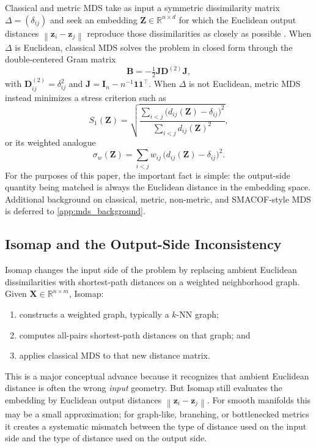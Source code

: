 \documentclass[11pt]{article}
\newcommand{\R}{\mathbb{R}}
\newcommand{\bX}{\mathbf{X}}
\newcommand{\bz}{\mathbf{z}}
\newcommand{\bZ}{\mathbf{Z}}
\newcommand{\bD}{\mathbf{D}}
\newcommand{\bB}{\mathbf{B}}
\newcommand{\bI}{\mathbf{I}}
\newcommand{\bJ}{\mathbf{J}}
\newcommand{\norm}[1]{\left\|#1\right\|}
\newcommand{\StressOne}{S_1}
\theoremstyle{definition}
\theoremstyle{plain}
\theoremstyle{remark}
\begin{document}
Classical and metric MDS take as input a symmetric dissimilarity matrix
$\Delta=(\delta_{ij})$ and seek an embedding $\bZ\in\R^{n\times d}$ for which
the Euclidean output distances $\norm{\bz_i-\bz_j}$ reproduce those
dissimilarities as closely as possible
\citep{torgerson1952multidimensional, young1938discussion,
kruskal1964multidimensional, borg2005modern}.  When $\Delta$ is Euclidean,
classical MDS solves the problem in closed form through the double-centered
Gram matrix
\begin{equation}
  \bB = -\tfrac{1}{2} \bJ \bD^{(2)} \bJ,
  \label{eq:gram}
\end{equation}
with $\bD^{(2)}_{ij}=\delta_{ij}^2$ and
$\bJ=\bI_n-n^{-1}\mathbf{1}\mathbf{1}^\top$.  When $\Delta$ is not Euclidean,
metric MDS instead minimizes a stress criterion such as
\begin{equation}
  \StressOne(\bZ) = \sqrt{
    \frac{\displaystyle\sum_{i < j}
          \bigl(d_{ij}(\bZ) - \delta_{ij}\bigr)^2}
         {\displaystyle\sum_{i < j} d_{ij}(\bZ)^2}
  },
  \label{eq:stress1}
\end{equation}
or its weighted analogue
\begin{equation}
  \sigma_w(\bZ)
  = \sum_{i < j} w_{ij}\,\bigl(d_{ij}(\bZ) - \delta_{ij}\bigr)^2.
  \label{eq:weighted_stress}
\end{equation}
For the purposes of this paper, the important fact is simple: the output-side
quantity being matched is always the Euclidean distance in the embedding space.
Additional background on classical, metric, non-metric, and SMACOF-style MDS
is deferred to \cref{app:mds_background}.

\subsection{Isomap and the Output-Side Inconsistency}
\label{sec:isomap}

Isomap \citep{tenenbaum2000global} changes the input side of the problem by
replacing ambient Euclidean dissimilarities with shortest-path distances on a
weighted neighborhood graph.  Given $\bX\in\R^{n\times m}$, Isomap:
\begin{enumerate}
  \item constructs a weighted graph, typically a $k$-NN graph;
  \item computes all-pairs shortest-path distances on that graph; and
  \item applies classical MDS to that new distance matrix.
\end{enumerate}
This is a major conceptual advance because it recognizes that ambient Euclidean
distance is often the wrong \emph{input} geometry.  But Isomap still evaluates
the embedding by Euclidean output distances $\norm{\bz_i-\bz_j}$.  For smooth
manifolds this may be a small approximation; for graph-like, branching, or
bottlenecked metrics it creates a systematic mismatch between the type of
distance used on the input side and the type of distance used on the output
side.
\end{document}
